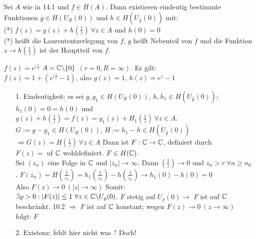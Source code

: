 \documentclass[a4paper,twoside,DIV15,BCOR12mm]{scrbook}
\begin{document}
\begin{satz} [Laurententwicklung]
  Sei $A$ wie in 14.1 und $f \in H(A)$. Dann existieren eindeutig bestimmte Funktionen $g \in H(U_R(0))$ und $h \in H(U_{\frac{1}{r}}(0))$ mit: \\
  (*) $f(z) = g(z) + h(\frac{1}{z})\ \forall z \in A$ und $h(0) = 0$ \\
  (*) heißt die Laurententzerlegung von $f$, $g$ heißt Nebenteil von $f$ und die Funktion $ z \rightarrow h(\frac{1}{z})$ ist der Hauptteil von $f$. 
\end{satz}

\begin{beispiel}
  $f(z) = e^{(\frac{1}{z}}$ $A = \mathbb{C} \backslash \{0\}$ $(r = 0, R = \infty)$. Es gilt: \\
  $f(z) = 1 + (  e^{(\frac{1}{z}} - 1 )$, also $g(z) = 1$, $h(z) = e^z -1 $
\end{beispiel}

\begin{beweis}
  \begin{itemize}
    \item[ 1. ] Eindeutigkeit: es sei $g, g_1 \in H(U_R(0))$, $h, h_1 \in H(U_{\frac{1}{r}}(0))$;
	$h_1(0) = 0 = h(0)$ und $g(z) + h(\frac{1}{z}) = f(z) = g_1(z) + H_1(\frac{1}{z})\ \forall z \in A$.\\
	$G := g - g_1 \in H(U_R(0))$, $H:= h_1 - h \in  H(U_{\frac{1}{r}}(0))$ \\
	$\Rightarrow G(z) = H(\frac{1}{z}) \ \forall z \in A$
	Dann ist $F:\mathbb{C} \rightarrow \mathbb{C}$, definiert durch \\
	$F(z) = $ uf $\mathbb{C}$ wohldefiniert. $F \in H(\mathbb{C})$. \\
	Sei $(z_n)$ eine Folge in $\mathbb{C}$ und $|z_n| \rightarrow \infty$. Dann $(\frac{1}{z}) \rightarrow 0$ und
	$z_n > r \ \forall n \ge n_0$. $F(z_n) = H(\frac{1}{z_n}) = h_1(\frac{1}{z_n}) - h(\frac{1}{z_n}) \rightarrow h_1(0) - h(0) = 0$\\
	Also $F(z) \rightarrow 0 \ (|z| \rightarrow \infty)$ Somit: \\
	$\exists \varrho > 0: |F(z)| \le 1 \ \forall z \in \MdC \backslash U_{\varrho}(0)$. $F$ stetig auf $ \overline{U_{\varrho}(0)} \rightarrow$
	$F$ ist auf $\mathbb{C}$ beschränkt. 10.2 $\Rightarrow$ $F$ ist auf $\mathbb{C}$ konstant; wegen 
	$F(z) \rightarrow 0 \ (z \rightarrow \infty)$ folgt: $F$ %
    \item[ 2. ] Existenz: fehlt hier nicht was ? Doch! 
  \end{itemize}
\end{beweis}
\end{document}
